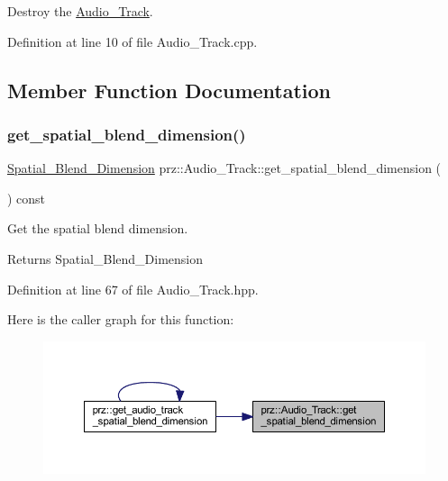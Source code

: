 Destroy the \mbox{\hyperlink{classprz_1_1_audio___track}{Audio\+\_\+\+Track}}. 



Definition at line 10 of file Audio\+\_\+\+Track.\+cpp.



\subsection{Member Function Documentation}
\mbox{\label{classprz_1_1_audio___track_ac10fc428fddc350fb7e6b4d29d287a3a}} 
\subsubsection{\texorpdfstring{get\_spatial\_blend\_dimension()}{get\_spatial\_blend\_dimension()}}
{\footnotesize\ttfamily \mbox{\hyperlink{classprz_1_1_audio___track_a4fb1dc3dd45713ba4c3e56918721d12a}{Spatial\+\_\+\+Blend\+\_\+\+Dimension}} prz\+::\+Audio\+\_\+\+Track\+::get\+\_\+spatial\+\_\+blend\+\_\+dimension (\begin{DoxyParamCaption}{ }\end{DoxyParamCaption}) const\hspace{0.3cm}{\ttfamily [inline]}}



Get the spatial blend dimension. 

\begin{DoxyReturn}{Returns}
Spatial\+\_\+\+Blend\+\_\+\+Dimension 
\end{DoxyReturn}


Definition at line 67 of file Audio\+\_\+\+Track.\+hpp.

Here is the caller graph for this function\+:
\nopagebreak
\begin{figure}[H]
\begin{center}
\leavevmode
\includegraphics[width=350pt]{classprz_1_1_audio___track_ac10fc428fddc350fb7e6b4d29d287a3a_icgraph}
\end{center}
\end{figure}
\mbox{\label{classprz_1_1_audio___track_ad3a1f86e10f7e128a5589b621ff28b45}} 
